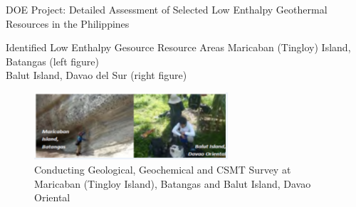 \begin{frame}{DOE Project: Detailed Assessment of Selected Low Enthalpy Geothermal
Resources in the Philippines\cite{halcon2015detailed}}
    \begin{block}{Identified Low Enthalpy Gesource Resource Areas}
        Maricaban (Tingloy) Island, Batangas (left figure) \\
        Balut Island, Davao del Sur (right figure)
    \end{block}
    \begin{figure}
        \centering
        \includegraphics[height=2.5cm]{images/DOEmaricaban.PNG}
        \caption{\centering \small Conducting Geological, Geochemical and CSMT Survey at Maricaban (Tingloy Island), Batangas and Balut Island, Davao Oriental}
    \end{figure}
\end{frame}

